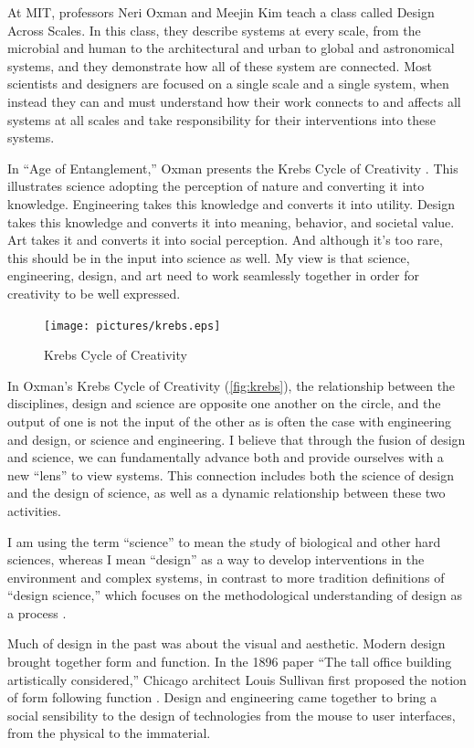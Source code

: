 At MIT, professors Neri Oxman and Meejin Kim teach a class called Design Across Scales. In this class, they describe systems at every scale, from the microbial and human to the architectural and urban to global and astronomical systems, and they demonstrate how all of these system are connected. Most scientists and designers are focused on a single scale and a single system, when instead they can and must understand how their work connects to and affects all systems at all scales and take responsibility for their interventions into these systems.

In ``Age of Entanglement,'' Oxman presents the Krebs Cycle of Creativity \cite{oxman_entanglement_2016}. This illustrates science adopting the perception of nature and converting it into knowledge. Engineering takes this knowledge and converts it into utility. Design takes this knowledge and converts it into meaning, behavior, and societal value. Art takes it and converts it into social perception. And although it's too rare, this should be in the input into science as well. My view is that science, engineering, design, and art need to work seamlessly together in order for creativity to be well expressed.

\begin{figure}[h]
\centering
\texttt{[image: pictures/krebs.eps]}
\caption{Krebs Cycle of Creativity \cite{oxman_entanglement_2016}}
\label{fig:krebs}
\end{figure}

In Oxman's Krebs Cycle of Creativity (\autoref{fig:krebs}), the relationship between the disciplines, design and science are opposite one another on the circle, and the output of one is not the input of the other as is often the case with engineering and design, or science and engineering. I believe that through the fusion of design and science, we can fundamentally advance both and provide ourselves with a new ``lens'' to view systems. This connection includes both the science of design and the design of science, as well as a dynamic relationship between these two activities.

I am using the term ``science'' to mean the study of biological and other hard sciences, whereas I mean ``design'' as a way to develop interventions in the environment and complex systems, in contrast to more tradition definitions of ``design science,'' which focuses on the methodological understanding of design as a process \cite{cross2001designerly}.

Much of design in the past was about the  visual and aesthetic. Modern design brought together form and function. In the 1896 paper ``The tall office building artistically considered,'' Chicago architect Louis Sullivan first proposed the notion of form following function \cite{sullivan1896tall}. Design and engineering came together to bring a social sensibility to the design of technologies from the mouse to user interfaces, from the physical to the immaterial. 

